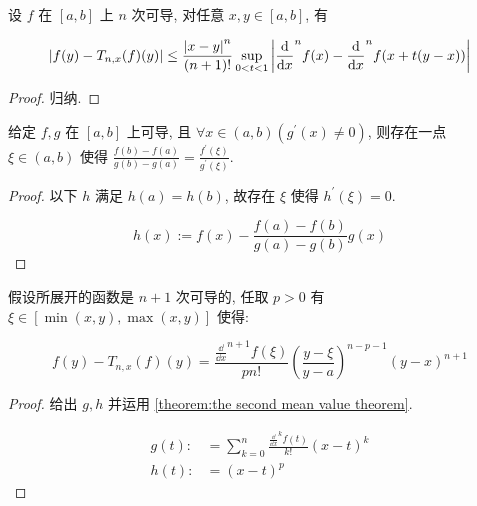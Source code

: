 \begin{lemma}
    设 \(f\) 在 \([a,b]\) 上 \(n\) 次可导, 对任意 \(x,y \in [a,b]\), 有

    \[
        \abs {f(y) - T_{n,x} (f) (y)} \leq \frac{\abs{x - y}^n}{(n+1)!} \sup_{0 < t < 1} \abs {\frac{\dd}{\dd x}^{n} f(x) - \frac{\dd}{\dd x}^n f(x + t (y-x))}
    \]

    \begin{proof}
        归纳.
    \end{proof}
\end{lemma}

\begin{theorem}[第二中值定理]
    \label {theorem:the second mean value theorem}
    给定 \(f,g\) 在 \([a,b]\) 上可导, 且 \(\forall x \in (a,b) (g^\prime(x) \neq 0)\),
    则存在一点 \(\xi \in (a,b)\) 使得 \(\frac{f(b) - f(a)}{g(b) - g(a)} = \frac{f^\prime (\xi)}{g^\prime (\xi)}\).

    \begin{proof}
        以下 \(h\) 满足 \(h(a) = h(b)\), 故存在 \(\xi\) 使得 \(h^\prime (\xi)= 0\).

        \[
            h(x) := f(x) - \frac{f(a) - f(b)}{g(a) - g(b)} g(x)
        \]
    \end{proof}
\end{theorem}

\begin{lemma}
    假设所展开的函数是 \(n+1\) 次可导的, 任取 \(p > 0\) 有 \(\xi \in [\min (x,y),\max (x,y)]\) 使得:

    \[
        f(y) - T_{n,x} (f) (y) = \frac{\frac{\dd}{\dd x}^{n+1} f (\xi)}{p n!} {(\frac{y-\xi}{y-a})}^{n-p-1} {(y-x)}^{n+1}
    \]

    \begin{proof}
        给出 \(g,h\) 并运用 \ref{theorem:the second mean value theorem}.

        \[
            \begin{aligned}
                g(t) :&= \sum_{k=0}^{n} \frac{\frac{\dd}{\dd x}^{k} f(t)}{k!} {(x-t)}^k \\
                h(t) :&= {(x-t)}^p
            \end{aligned}
        \]
    \end{proof}
\end{lemma}

